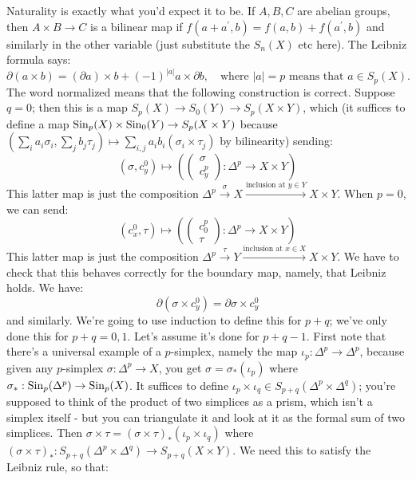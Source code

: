 Naturality is exactly what you'd expect it to be. If $A,B,C$ are abelian groups, then $A\times B\to C$ is a bilinear map if $f(a+a^\prime,b)=f(a,b)+f(a^\prime,b)$ and similarly in the other variable (just substitute the $S_n(X)$ etc here). The Leibniz formula says:
		\begin{equation*}
		\partial(a\times b) = (\partial a)\times b + (-1)^{|a|}a\times\partial b,\quad\text{where }|a|=p\text{ means that }a\in S_p(X).
		\end{equation*}
The word normalized means that the following construction is correct. Suppose $q=0$; then this is a map $S_p(X)\to S_0(Y)\to S_p(X\times Y)$, which (it suffices to define a map $\mathrm{Sin}_p(X)\times \mathrm{Sin}_0(Y)\to S_p(X\times Y)$ because $\left(\sum_i a_i\sigma_i,\sum_j b_j\tau_j\right)\mapsto \sum_{i,j}a_ib_i(\sigma_i\times\tau_j)$ by bilinearity) sending:
		\begin{equation*}
		(\sigma, c^0_y)\mapsto \left(\begin{pmatrix}\sigma \\ c^p_y\end{pmatrix}:\Delta^p\to X\times Y\right)
		\end{equation*}
This latter map is just the composition $\Delta^p\xrightarrow{\sigma} X\xrightarrow{\text{inclusion at }y\in Y}X\times Y$. When $p=0$, we can send:
		\begin{equation*}
		(c^0_x,\tau)\mapsto \left(\begin{pmatrix}c^p_0 \\ \tau\end{pmatrix}:\Delta^p\to X\times Y\right)
		\end{equation*}
This latter map is just the composition $\Delta^p\xrightarrow{\tau} Y\xrightarrow{\text{inclusion at }x\in X}X\times Y$. We have to check that this behaves correctly for the boundary map, namely, that Leibniz holds. We have:
		\begin{equation*}
		\partial(\sigma\times c^0_y) = \partial\sigma\times c^0_y
		\end{equation*}
and similarly. We're going to use induction to define this for $p+q$; we've only done this for $p+q=0,1$. Let's assume it's done for $p+q-1$. First note that there's a universal example of a $p$-simplex, namely the map $\iota_p:\Delta^p\to \Delta^p$, because given any $p$-simplex $\sigma:\Delta^p\to X$, you get $\sigma=\sigma_\ast(\iota_p)$ where $\sigma_\ast:\mathrm{Sin}_p(\Delta^p)\to \mathrm{Sin}_p(X)$. It suffices to define $\iota_p\times\iota_q\in S_{p+q}(\Delta^p\times\Delta^q)$; you're supposed to think of the product of two simplices as a prism, which isn't a simplex itself - but you can triangulate it and look at it as the formal sum of two simplices. Then $\sigma\times \tau = (\sigma\times\tau)_\ast(\iota_p\times\iota_q)$ where $(\sigma\times\tau)_\ast:S_{p+q}(\Delta^p\times\Delta^q)\to S_{p+q}(X\times Y)$. We need this to satisfy the Leibniz rule, so that:
